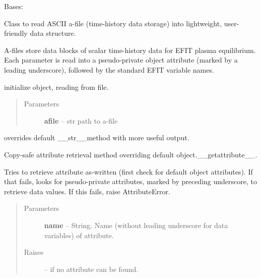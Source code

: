 \documentclass[letterpaper,10pt,english]{sphinxmanual}
\begin{document}
\begin{fulllineitems}
\label{eqtools:eqtools.afilereader.AFileReader}
Bases: 

Class to read ASCII a-file (time-history data storage) into lightweight, user-friendly data structure.

A-files store data blocks of scalar time-history data for EFIT plasma equilibrium.  Each parameter is
read into a pseudo-private object attribute (marked by a leading underscore), followed by the standard
EFIT variable names.

initialize object, reading from file.
\begin{quote}\begin{description}
\item[{Parameters }] \leavevmode
\textbf{afile} --
str
path to a-file

\end{description}\end{quote}

\begin{fulllineitems}
\label{eqtools:eqtools.afilereader.AFileReader.__str__}
overrides default \_\_str\_\_method with more useful output.

\end{fulllineitems}


\begin{fulllineitems}
\label{eqtools:eqtools.afilereader.AFileReader.__getattribute__}
Copy-safe attribute retrieval method overriding default object.\_\_getattribute\_\_.

Tries to retrieve attribute as-written (first check for default object attributes).
If that fails, looks for pseudo-private attributes, marked by preceding underscore,
to retrieve data values.  If this fails, raise AttributeError.
\begin{quote}\begin{description}
\item[{Parameters }] \leavevmode
\textbf{name} --
String.  Name (without leading underscore for data variables) of attribute.

\item[{Raises }] \leavevmode
{} -- 
if no attribute can be found.


\end{description}
\end{quote}
\end{fulllineitems}
\end{fulllineitems}
\end{document}
